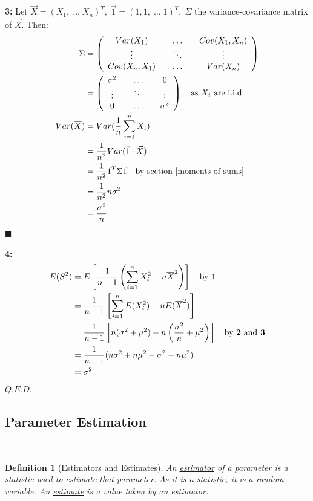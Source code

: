 \documentclass[12pt,a4paper]{article}
\newtheorem{defn}[thm]{Definition}
\begin{document}
{\bf 3:} Let $\vec{X} = (X_1,\; \hdots\; X_n)^T,\; \vec{1} = (1,1,\; \hdots\; 1)^T,\; \Sigma$ the variance-covariance matrix of $\vec{X}$. Then:
\begin{align*}
\Sigma &= \left(\begin{array}{ccc} Var(X_1)\quad& \hdots\quad& Cov(X_1,X_n)\\ \vdots\quad & \ddots\quad & \vdots\\ Cov(X_n,X_1)\quad& \hdots\quad& Var(X_n)\end{array}\right)\\
&= \left(\begin{array}{ccc} \sigma^2\quad& \hdots\quad& 0\\ \vdots\quad & \ddots\quad & \vdots\\ 0\quad &\hdots\quad &\sigma^2\end{array}\right)\quad\mbox{as $X_i$ are i.i.d.}\\
Var(\overline{X}) &= Var(\frac{1}{n}\sum_{i=1}^n X_i)\\
&= \frac{1}{n^2}Var(\vec{1} \cdot \vec{X})\\
&= \frac{1}{n^2} \vec{1}^T\Sigma\vec{1}\quad\mbox{by section \ref{moments of sums}}\\
&= \frac{1}{n^2}n\sigma^2\\
&= \frac{\sigma^2}{n}
\end{align*}\hfill$\blacksquare$

{\bf 4:}
\begin{align*}
E(S^2) &= E\left[\frac{1}{n-1}\left(\sum_{i=1}^n X_i^2 -n\overline{X}^2\right)\right]\quad\mbox{by {\bf 1}}\\
&= \frac{1}{n-1}\left[\sum_{i=1}^n E(X_i^2) - nE(\overline{X}^2)\right]\\
&= \frac{1}{n-1}\left[n(\sigma^2 + \mu^2) - n\left(\frac{\sigma^2}{n} + \mu^2\right)\right]\quad\mbox{by {\bf 2} and {\bf 3}}\\
&= \frac{1}{n-1}(n\sigma^2 + n\mu^2 - \sigma^2 -n\mu^2)\\
&= \sigma^2
\end{align*}\hfill$Q.E.D.$

\subsection{Parameter Estimation}$\;$

\begin{defn}[Estimators and Estimates]\vspace{1cm}

An \underline{estimator} of a parameter is a statistic used to estimate that parameter. As it is a statistic, it is a random variable. An \underline{estimate} is a value taken by an estimator.

\end{defn}
\end{document}
